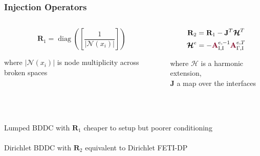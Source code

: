 \documentclass{beamer}
\DeclareMathOperator{\diag}{diag}
\begin{document}
\begin{frame}
\begin{center}
\frametitle{Injection Operators}

\begin{columns}[onlytextwidth]
  \begin{column}{0.49\textwidth}
  \begin{center}

  \begin{equation}
  \mathbf{R}_1 = \diag \left( \left[ \frac{1}{\lvert \mathcal{N} \left( x_i \right) \rvert} \right] \right)
  \end{equation}

  where $\lvert \mathcal{N} \left( x_i \right) \rvert$ is node multiplicity across broken spaces\\
  \end{center}
  \end{column}

  \begin{column}{0.45\textwidth}
  \begin{center}
  \begin{equation}
  \begin{gathered}
  \mathbf{R}_2 = \mathbf{R}_1 - \mathbf{J}^T \boldsymbol{\mathcal{H}}^T\\
  \boldsymbol{\mathcal{H}}^e = - {\color{burgundy}\mathbf{A}}_{\text{I}, \text{I}}^{e, -1} {\color{burgundy}\mathbf{A}}_{\Gamma, \text{I}}^{e, T}
  \end{gathered}
  \end{equation}

  where $\boldsymbol{\mathcal{H}}$ is a harmonic extension,\\$\mathbf{J}$ a map over the interfaces
  \end{center}
  \end{column}
\end{columns}

~\\

~\\

Lumped BDDC with $\mathbf{R}_1$ cheaper to setup but poorer conditioning\\

~\\

Dirichlet BDDC with $\mathbf{R}_2$ equivalent to Dirichlet FETI-DP

\end{center}
\end{frame}
\end{document}
